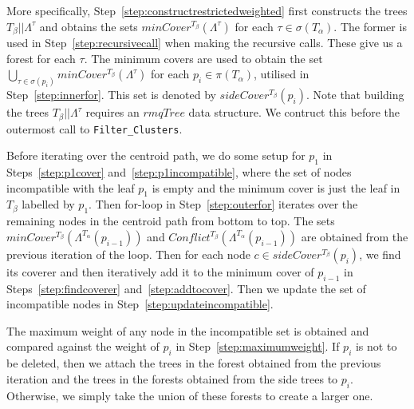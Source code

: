 \documentclass[final,1p,times]{elsarticle}
\newcommand{\leafset}{\Lambda}
\newcommand{\TA}{T_\alpha}
\newcommand{\TB}{T_\beta}
\begin{document}
    More specifically, Step~\ref{step:constructrestrictedweighted} first constructs the trees $\TB||\leafset^{\tau}$ and obtains the sets $minCover^{\TB}(\leafset^{\tau})$ for each $\tau \in \sigma(\TA)$. The former is used in Step~\ref{step:recursivecall} when making the recursive calls. These give us a forest for each $\tau$. The minimum covers are used to obtain the set $\bigcup_{\tau \in \sigma(p_i)} minCover^{\TB}(\leafset^{\tau})$ for each $p_i \in \pi(\TA)$, utilised in Step~\ref{step:innerfor}. This set is denoted by $sideCover^{\TB}(p_i)$. Note that building the trees $\TB||\leafset^{\tau}$ requires an $rmqTree$ data structure. We contruct this before the outermost call to \texttt{Filter\_Clusters}.

    Before iterating over the centroid path, we do some setup for $p_1$ in Steps~\ref{step:p1cover} and~\ref{step:p1incompatible}, where the set of nodes incompatible with the leaf $p_1$ is empty and the minimum cover is just the leaf in $\TB$ labelled by $p_1$. Then for-loop in Step~\ref{step:outerfor} iterates over the remaining nodes in the centroid path from bottom to top. The sets $minCover^{\TB}(\leafset^{\TA}(p_{i-1}))$ and $Conflict^{\TB}(\leafset^{\TA}(p_{i-1}))$ are obtained from the previous iteration of the loop. Then for each node $c \in sideCover^{\TB}(p_i)$, we find its coverer and then iteratively add it to the minimum cover of $p_{i-1}$ in Steps~\ref{step:findcoverer} and~\ref{step:addtocover}. Then we update the set of incompatible nodes in Step~\ref{step:updateincompatible}.

    The maximum weight of any node in the incompatible set is obtained and compared against the weight of $p_i$ in Step~\ref{step:maximumweight}. If $p_i$ is not to be deleted, then we attach the trees in the forest obtained from the previous iteration and the trees in the forests obtained from the side trees to $p_i$. Otherwise, we simply take the union of these forests to create a larger one.
\end{document}
